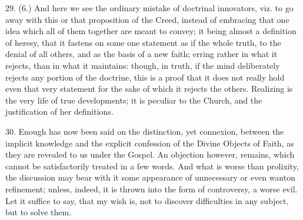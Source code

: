 29. (6.) And here we see the ordinary mistake of doctrinal
innovators, viz. to go away with this or that proposition of the
Creed, instead of embracing that one idea which all of them together
are meant to convey; it being almost a definition of heresy, that it
fastens on some one statement as if the whole truth, to the denial of
all others, and as the basis of a new faith; erring rather in what it
rejects, than in what it maintains: though, in truth, if the mind
deliberately rejects any portion of the doctrine, this is a proof that
it does not really hold even that very statement for the sake of which
it rejects the others. Realizing is the very life of true
developments; it is peculiar to the Church, and the justification of
her definitions.

30. Enough has now been said on the distinction, yet connexion,
between the implicit knowledge and the explicit confession of the
Divine Objects of Faith, as they are revealed to us under the Gospel.
An objection however, remains, which cannot be satisfactorily treated
in a few words. And what is worse than prolixity, the discussion may
bear with it some appearance of unnecessary or even wanton refinement;
unless, indeed, it is thrown into the form of controversy, a worse
evil. Let it suffice to say, that my wish is, not to discover
difficulties in any subject, but to solve them.


